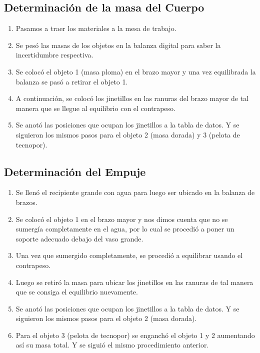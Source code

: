 \documentclass[../main.tex]{subfiles}
\begin{document}
\subsection{Determinación de la masa del Cuerpo}
\begin{enumerate}
    \item Pasamos a traer los materiales a la mesa de trabajo.
    \item Se pesó las masas de los objetos en la balanza digital para saber la incertidumbre respectiva.
    \item Se colocó el objeto 1 (masa ploma) en el brazo mayor y una vez equilibrada la balanza se pasó a retirar el objeto 1.
    \item A continuación, se colocó los jinetillos en las ranuras del brazo mayor de tal manera que se llegue al equilibrio con el contrapeso.
    \item Se anotó las posiciones que ocupan los jinetillos a la tabla de datos. Y se siguieron los mismos pasos para el objeto 2 (masa dorada) y 3 (pelota de tecnopor).
\end{enumerate}

\subsection{Determinación del Empuje}
\begin{enumerate}
    \item Se llenó el recipiente grande con agua para luego ser ubicado en la balanza de brazos.
    \item Se colocó el objeto 1 en el brazo mayor y nos dimos cuenta que no se sumergía completamente en el agua, por lo cual se procedió a poner un soporte adecuado debajo del vaso grande.
    \item Una vez que sumergido completamente, se procedió a equilibrar usando el contrapeso.
    \item Luego se retiró la masa para ubicar los jinetillos en las ranuras de tal manera que se consiga el equilibrio nuevamente.
    \item Se anotó las posiciones que ocupan los jinetillos a la tabla de datos. Y se siguieron los mismos pasos para el objeto 2 (masa dorada).
    \item Para el objeto 3 (pelota de tecnopor) se enganchó el objeto 1 y 2 aumentando así su masa total. Y se siguió el mismo procedimiento anterior.
\end{enumerate}
  
\end{document}
